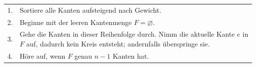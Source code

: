 \begin{merksatz}
\begin{center}
\renewcommand{\arraystretch}{1.55}
\begin{tabular}{@{}P{1.2cm}P{7.2cm}@{}}
. & Sortiere alle Kanten aufsteigend nach Gewicht.\\
2. & Beginne mit der leeren Kantenmenge $F = \varnothing$.\\
3. & Gehe die Kanten in dieser Reihenfolge durch. Nimm die aktuelle Kante $e$ in $F$ auf,  dadurch kein Kreis entsteht; andernfalls überspringe sie.\\
4. & Höre auf, wenn $F$ genau $n-1$ Kanten hat.\\
\bottomrule
\end{tabular}
\end{center}

\begin{center}
\begin{minipage}{0.88\textwidth}
\end{minipage}
\end{center}
\end{merksatz}

